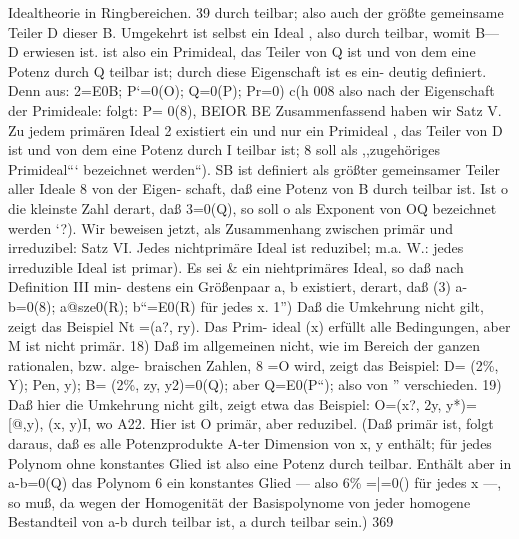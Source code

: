 \documentclass[11pt,a4paper]{article}
\theoremstyle{plain}
\theoremstyle{definition}
\begin{document}
Idealtheorie in Ringbereichen. 
39 
durch  teilbar; 
also auch der größte gemeinsame Teiler D dieser B. 
Umgekehrt ist  selbst ein Ideal , also durch  teilbar, womit 
B--- D 
erwiesen 
ist. 
 ist also 
ein Primideal, 
das Teiler von Q ist und von 
dem eine Potenz durch Q teilbar ist; durch diese Eigenschaft ist es ein- 
deutig definiert. 
Denn aus: 
2=E0B; P`=0(O); Q=0(P); Pr=0) 
c(h 008 
also nach der Eigenschaft der Primideale: 
folgt: 
P= 0(8), BEIOR BE 
Zusammenfassend haben wir 
Satz V. 
Zu jedem primären Ideal 2 existiert 
ein und nur ein 
Primideal , das Teiler von D ist und von dem eine Potenz durch I 
teilbar ist; 8 soll als ,,zugehöriges Primideal``` bezeichnet werden``). 
SB ist 
definiert 
als größter gemeinsamer Teiler aller Ideale 8 von der Eigen- 
schaft, daß eine Potenz von B durch  teilbar ist. 
Ist o die kleinste 
Zahl derart, daß 3\textdegree{}=0(Q), 
so soll o als Exponent von OQ bezeichnet 
werden `?). 
Wir beweisen jetzt, als Zusammenhang zwischen primär und irreduzibel: 
Satz VI. 
Jedes nichtprimäre Ideal ist reduzibel; 
m.a. W.: jedes 
irreduzible Ideal ist primar). 
Es sei \& ein niehtprimäres Ideal, 
so daß nach Definition III min- 
destens ein Größenpaar a, b existiert, derart, daß 
(3) 
a-b=0(8); 
a@sze0(R); 
b``=E0(R) 
für jedes x. 
1'') Daß die Umkehrung nicht gilt, zeigt das Beispiel Nt =(a?, ry). 
Das Prim- 
ideal (x) erfüllt alle Bedingungen, aber M ist nicht primär. 
18) Daß im allgemeinen nicht, wie im Bereich der ganzen rationalen, bzw. alge- 
braischen Zahlen, 8\textdegree{} =O wird, zeigt das Beispiel: 
D= (2\%, Y); Pen, y); B= (2\%, zy, y2)=0(Q); 
aber Q=E0(P``); 
also  von '' verschieden. 
19) Daß hier die Umkehrung nicht gilt, zeigt etwa das Beispiel: 
O=(x?, 2y, y*)=[@,y), (x, y)I, 
wo A22. 
Hier ist O primär, aber reduzibel. 
(Daß  primär ist, folgt daraus, daß 
es alle Potenzprodukte A-ter Dimension von x, y enthält; 
für jedes Polynom ohne 
konstantes Glied ist also eine Potenz durch  teilbar. 
Enthält aber in a-b=0(Q) 
das Polynom 6 ein konstantes Glied --- also 6\% =|=0() für jedes 
x ---, so muß, da 
wegen der Homogenität der Basispolynome von  jeder homogene Bestandteil von 
a-b durch  teilbar ist, a durch  teilbar sein.) 
369
\end{document}
